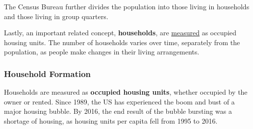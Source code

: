 \documentclass{report}
\begin{document}
{\begin{minipage}{0.76\textwidth}
The Census Bureau further divides the population into those living in households and those living in group quarters.  

Lastly, an important related concept, \textbf{households}, are \href{https://www.census.gov/housing/hvs/index.html}{measured} as occupied housing units. The number of households varies over time, separately from the population, as people make changes in their living arrangements.  
\end{minipage}
\newpage
\begin{minipage}{0.76\textwidth}   
\subsubsection*{Household Formation}
\small Households are measured as \textbf{occupied housing units}, whether occupied by the owner or rented. Since 1989, the US has experienced the boom and bust of a major housing bubble. By 2016, the end result of the bubble bursting was a shortage of housing, as housing units per capita fell from 1995 to 2016. 
\vspace{1mm}
 

\end{minipage}}
\end{document}
